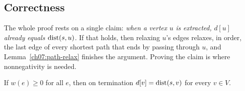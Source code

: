 \subsection{Correctness}

\begin{whybox}
The whole proof rests on a single claim: \emph{when a vertex $u$ is extracted, $d[u]$
already equals $\operatorname{dist}(s,u)$.} If that holds, then relaxing $u$'s edges relaxes, in order,
the last edge of every shortest path that ends by passing through $u$, and
Lemma~\ref{ch07:path-relax} finishes the argument. Proving the claim is where nonnegativity is
needed.
\end{whybox}

\begin{theorem}
\label{ch07:dijkstra-correct}
If $w(e)\ge 0$ for all $e$, then on termination $d[v]=\operatorname{dist}(s,v)$ for every $v\in V$.
\end{theorem}


